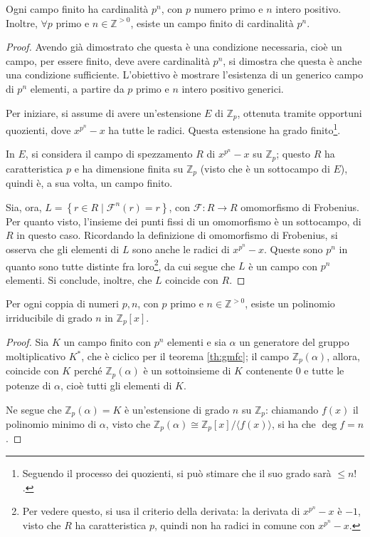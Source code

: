 \documentclass[11pt, a4paper]{scrartcl}
\theoremstyle{definition}
\numberwithin{esempio}{section}
\theoremstyle{definition}
\numberwithin{obs}{section}
\numberwithin{nota}{section}
\numberwithin{equation}{subsection}
\begin{document}
\begin{teorema}
	{}{}
	Ogni campo finito ha cardinalit\`a $p^n$, con $p$ numero primo e $n$ intero positivo.
	Inoltre, $\forall p$ primo e $n \in \mathbb{Z}^{>0} $, esiste un campo finito di cardinalit\`a $p^n$.
	\begin{proof}
		Avendo gi\`a dimostrato che questa \`e una condizione necessaria, cio\`e un campo, per essere finito, deve avere cardinalit\`a $p^n$, si dimostra che questa \`e anche una condizione sufficiente.
L'obiettivo \`e mostrare l'esistenza di un generico campo di $p^n$ elementi, a partire da $p$ primo e $n$ intero positivo generici.

Per iniziare, si assume di avere un'estensione $E$ di $\mathbb{Z}_p$, ottenuta tramite opportuni quozienti, dove $x^{p^n} -x$ ha tutte le radici.
Questa estensione ha grado finito\footnote{Seguendo il processo dei quozienti, si pu\`o stimare che il suo grado sar\`a $\le  n!$.}.

In $E$, si considera il campo di spezzamento $R$ di $x^{p^n} -x$ su $\mathbb{Z}_p$; questo $R$ ha caratteristica $p$ e ha dimensione finita su $\mathbb{Z}_p$ (visto che \`e un sottocampo di $E$), quindi \`e, a sua volta, un campo finito.

Sia, ora, $L = \left\{ r \in R  \mid \mathcal{F} ^n (r) = r \right\} $, con $\mathcal{F} :R \to R$ omomorfismo di Frobenius.
Per quanto visto, l'insieme dei punti fissi di un omomorfismo \`e un sottocampo, di $R$ in questo caso.
Ricordando la definizione di omomorfismo di Frobenius, si osserva che gli elementi di $L$ sono anche le radici di $x^{p^n} - x$.
Queste sono $p^n$ in quanto sono tutte distinte fra loro\footnote{Per vedere questo, si usa il criterio della derivata: la derivata di $x^{p^n} -x$ \`e $-1$, visto che $R$ ha caratteristica $p$, quindi non ha radici in comune con $x^{p^n} -x$.}, da cui segue che $L$ \`e un campo con $p^n$ elementi.
Si conclude, inoltre, che $L$ coincide con $R$.
	\end{proof}
\end{teorema}
\begin{corollario}
	{}{}
	Per ogni coppia di numeri $p,n$, con $p$ primo e $n \in \mathbb{Z}^{>0}$, esiste un polinomio irriducibile di grado $n$ in $\mathbb{Z}_p[x]$.
	\begin{proof}
		Sia $K$ un campo finito con $p^n$ elementi e sia $\alpha $ un generatore del gruppo moltiplicativo $K^*$, che \`e ciclico per il teorema \ref{th:gmfc}; il campo $\mathbb{Z}_p(\alpha )$, allora, coincide con $K$ perch\'e $\mathbb{Z}_p(\alpha )$ \`e un sottoinsieme di $K$ contenente $0$ e tutte le potenze di $\alpha $, cio\`e tutti gli elementi di $K$.

		Ne segue che $\mathbb{Z}_p(\alpha ) = K$ \`e un'estensione di grado $n$ su $\mathbb{Z}_p$: chiamando $f(x)$ il polinomio minimo di $\alpha $, visto che $\mathbb{Z}_p(\alpha ) \cong \mathbb{Z}_p[x] / \langle f(x) \rangle$, si ha che $\operatorname{deg} f = n$.
	\end{proof}
\end{corollario}
\end{document}
